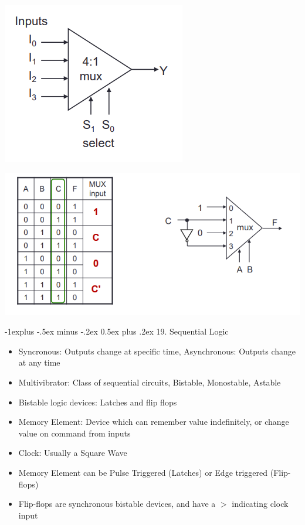 \documentclass[10pt, portrait]{article}
\makeatletter
\renewcommand{\section}{\@startsection{section}{1}{0mm}%
                                {-1ex plus -.5ex minus -.2ex}%
                                {0.5ex plus .2ex}%
                                {\normalfont\large\bfseries}}
\renewcommand{\section}{\@startsection{section}{2}{0mm}%
                                {-1explus -.5ex minus -.2ex}%
                                {0.5ex plus .2ex}%
                                {\normalfont\normalsize\bfseries}}
\makeatother
\begin{document}
\begin{multicols*}{2}
\begin{center}
    \includegraphics[width=0.5\linewidth]{multiplexer.png}
\end{center}
\begin{center}
    \includegraphics[width=0.7\linewidth]{squeeze.png}
\end{center}

\section{19. Sequential Logic}
\begin{itemize}
    \item Syncronous: Outputs change at specific time, Asynchronous: Outputs change at any time
    \item Multivibrator: Class of sequential circuits, Bistable, Monostable, Astable
    \item Bistable logic devices: Latches and flip flops
    \item Memory Element: Device which can remember value indefinitely, or change value on command from inputs
    \item Clock: Usually a Square Wave
    \item Memory Element can be Pulse Triggered (Latches) or Edge triggered (Flip-flops)
    \item Flip-flops are synchronous bistable devices, and have a $>$ indicating clock input
\end{itemize}


\end{multicols*}
\end{document}
